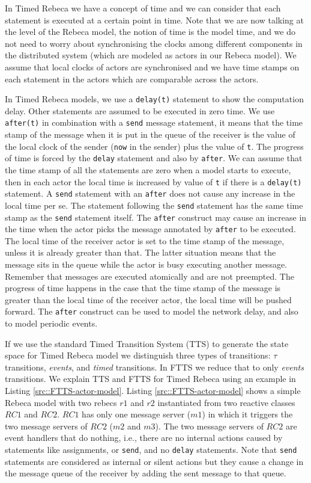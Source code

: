 In Timed Rebeca we have a concept of time and we can consider that each statement is executed at a certain point in time. Note that we are now talking at the level of the Rebeca model, the notion of time is the model time, and we do not need to worry about synchronising the clocks among different components in the distributed system (which are modeled as actors in our Rebeca model). We assume that local clocks of actors are synchronised and we  have time stamps on each statement  in the actors which are comparable across the actors.

In Timed Rebeca models, we use a \texttt{delay(t)} statement to show the computation delay. Other statements are assumed to be executed in zero time. We use  \texttt{after(t)} in combination with a \texttt{send} message statement, it means that the time stamp of the message when it is put in the queue of the receiver is the value of the local clock of the sender (\texttt{now} in the sender) plus the value of \texttt{t}.
The progress of time is forced by the \texttt{delay} statement and also by \texttt{after}. 
We can assume that the time stamp of all the statements are zero when a model starts to execute, then in each actor the local time is increased by value of \texttt{t} if there is a \texttt{delay(t)} statement.
A \texttt{send} statement with an  \texttt{after} does not cause any increase in the local time per se. The statement following the \texttt{send} statement has the same time stamp as the \texttt{send} statement itself.
The \texttt{after} construct may cause an increase in the time when the actor picks the message annotated by \texttt{after} to be executed. The local time of the receiver actor is set to the time stamp of the message, unless it is already greater than that.
The latter situation means that the message  sits in the queue while the actor is busy executing another message.
Remember that messages are executed atomically and are not preempted.
%
The progress of time happens in the case that the time stamp of the message is greater than the local time of the receiver actor, the local time will be pushed forward.
%
The \texttt{after} construct can be used to model the network delay, and also to model periodic events.


If we use the standard Timed Transition System (TTS) to generate the state space for Timed Rebeca model we distinguish three types of transitions: $\tau$ transitions, \textit{events}, and \textit{timed} transitions.
In FTTS we reduce that to only \textit{events} transitions.
%
We explain TTS and FTTS for Timed Rebeca using an example in Listing \ref{src::FTTS-actor-model}.
Listing \ref{src::FTTS-actor-model} shows a simple Rebeca model with two rebecs $r1$ and $r2$ instantiated from two reactive classes $RC1$ and $RC2$.
$RC1$ has only one message server ($m1$) in which it triggers the two message servers of $RC2$ ($m2$ and $m3$).
The two message servers of $RC2$ are event handlers that do nothing, i.e., there are no internal actions caused by statements like assignments, or \texttt{send}, and no  \texttt{delay} statements. Note that \texttt{send} statements are considered as internal or silent actions but they cause a change in the message queue of the receiver by adding the sent message to that queue.
 


